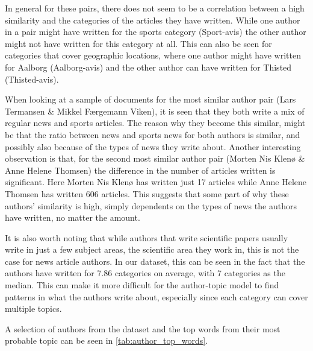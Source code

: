 In general for these pairs, there does not seem to be a correlation between a high similarity and the categories of the articles they have written.
While one author in a pair might have written for the sports category (Sport-avis) the other author might not have written for this category at all.
This can also be seen for categories that cover geographic locations, where one author might have written for Aalborg (Aalborg-avis) and the other author can have written for Thisted (Thisted-avis).

When looking at a sample of documents for the most similar author pair (Lars Termansen \& Mikkel Færgemann Viken), it is seen that they both write a mix of regular news and sports articles.
The reason why they become this similar, might be that the ratio between news and sports news for both authors is similar, and possibly also because of the types of news they write about.
Another interesting observation is that, for the second most similar author pair (Morten Nis Klenø \& Anne Helene Thomsen) the difference in the number of articles written is significant.
Here Morten Nis Klenø has written just 17 articles while Anne Helene Thomsen has written 606 articles.
This suggests that some part of why these authors' similarity is high, simply dependents on the types of news the authors have written, no matter the amount.

It is also worth noting that while authors that write scientific papers usually write in just a few subject areas, the scientific area they work in, this is not the case for news article authors.
In our dataset, this can be seen in the fact that the authors have written for 7.86 categories on average, with 7 categories as the median.
This can make it more difficult for the author-topic model to find patterns in what the authors write about, especially since each category can cover multiple topics.

A selection of authors from the dataset and the top words from their most probable topic can be seen in \autoref{tab:author_top_words}.


